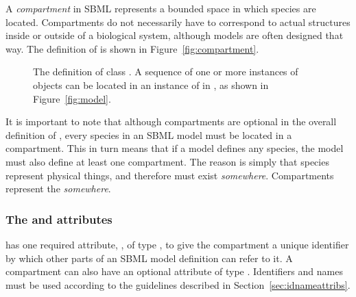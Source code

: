 A \emph{compartment} in SBML represents a bounded space in which
species are located.  Compartments do not necessarily have to
correspond to actual structures inside or outside of a biological
system, although models are often designed that way.  The definition
of \Compartment is shown in Figure~\vref{fig:compartment}.

\begin{figure}[htb]
  \centering
  \small
  \caption{The definition of class \Compartment.  A
      sequence of one or more instances of \Compartment objects
      can be located in an instance of \ListOfCompartments in
      \Model, as shown in Figure~\protect\ref{fig:model}.}
  \label{fig:compartment}
\end{figure}

It is important to note that although compartments are optional in
the overall definition of \Model, every species in an SBML model
must be located in a compartment.  This in turn means that if a
model defines any species, the model must also define at least one
compartment.  The reason is simply that species represent physical
things, and therefore must exist \emph{somewhere}.  Compartments
represent the \emph{somewhere}.


\subsubsection{The  and  attributes}

\Compartment has one required attribute, , of type
, to give the compartment a unique identifier by
which other parts of an SBML model definition can refer to it.  A
compartment can also have an optional  attribute of type
.  Identifiers and names must be used according
to the guidelines described in Section~\ref{sec:idnameattribs}.


